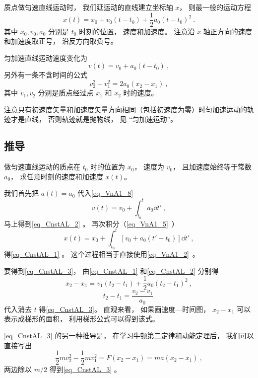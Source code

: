 

质点做匀速直线运动时， 我们延运动的直线建立坐标轴 $x$， 则最一般的运动方程
\begin{equation}\label{eq_CnstAL_1}
x(t) = x_0 + v_0 (t - t_0) +  \frac12 a_0 (t - t_0)^2~.
\end{equation}
其中 $x_0, v_0, a_0$ 分别是 $t_0$ 时刻的位置， 速度和加速度。 注意沿 $x$ 轴正方向的速度和加速度取正号， 沿反方向取负号。

匀加速直线运动速度变化为
\begin{equation}\label{eq_CnstAL_2}
v(t) = v_0 + a_0 (t - t_0)~,
\end{equation}
另外有一条不含时间的公式
\begin{equation}\label{eq_CnstAL_3}
v_2^2 - v_1^2 = 2a_0 (x_2 - x_1)~,
\end{equation}
其中 $v_1, v_2$ 分别是质点经过点 $x_1$ 和 $x_2$ 时的速度。

注意只有初速度矢量和加速度矢量方向相同（包括初速度为零）时匀加速运动的轨迹才是直线， 否则轨迹就是抛物线， 见 “匀加速运动”。

\subsection{推导}
做匀速直线运动的质点在 $t_0$ 时的位置为 $x_0$， 速度为 $v_0$， 且加速度始终等于常数 $a_0$， 求任意时刻的速度和加速度 $x(t)$。

我们首先把 $a(t) = a_0$ 代入\autoref{eq_VnA1_8}~
\begin{equation}
v(t) = v_0 + \int_{t_0}^t a_0 \dd{t'}~,
\end{equation}
马上得到\autoref{eq_CnstAL_2} 。 再次积分（\autoref{eq_VnA1_5}~）
\begin{equation}
x(t) = x_0 + \int_{t_0}^t [v_0 + a_0 (t' - t_0)] \dd{t'}~,
\end{equation}
得\autoref{eq_CnstAL_1} 。 这个过程相当于直接使用\autoref{eq_VnA1_2}~。

要得到\autoref{eq_CnstAL_3}， 由\autoref{eq_CnstAL_1} 和\autoref{eq_CnstAL_2} 分别得
\begin{equation}
x_2 - x_1 = v_1 (t_2 - t_1) +  \frac12 a_0 (t_2 - t_1)^2~,
\end{equation}
\begin{equation}
t_2 - t_1 = \frac{v_2 - v_1}{a_0}~
\end{equation}
代入消去 $t$ 得\autoref{eq_CnstAL_3}。 直观来看， 如果画速度—时间图， $x_2 - x_1$ 可以表示成梯形的面积， 利用梯形公式可以得到该式。

\autoref{eq_CnstAL_3} 的另一种推导是， 在学习牛顿第二定律和动能定理后， 我们可以直接写出
\begin{equation}
\frac{1}{2}mv_2^2 - \frac{1}{2}mv_1^2 = F (x_2 - x_1) = ma (x_2 - x_1)~,
\end{equation}
两边除以 $m/2$ 得到\autoref{eq_CnstAL_3} 。
